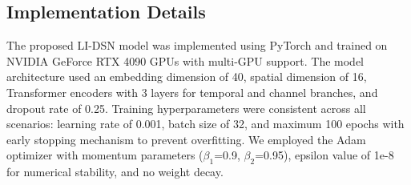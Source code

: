 \documentclass[journal]{IEEEtran}
\theoremstyle{plain}
\begin{document}
\begin{table}[!htbp]
    \caption{Emotion recognition results of different methods on the SEED and FACED datasets. (\textbf{Bold}: best; \underline{Underline}: second best)}
    \renewcommand{\arraystretch}{1.4}
    \centering
    \footnotesize
    \setlength{\tabcolsep}{1pt}
    \label{seedfaced}
\end{table}

\subsection{Implementation Details}
The proposed LI-DSN model was implemented using PyTorch and trained on NVIDIA GeForce RTX 4090 GPUs with multi-GPU support. The model architecture used an embedding dimension of 40, spatial dimension of 16, Transformer encoders with 3 layers for temporal and channel branches, and dropout rate of 0.25. Training hyperparameters were consistent across all scenarios: learning rate of 0.001, batch size of 32, and maximum 100 epochs with early stopping mechanism to prevent overfitting.  We employed the Adam optimizer with momentum parameters (\(\beta_{1}\)=0.9, \(\beta_{2}\)=0.95), epsilon value of 1e-8 for numerical stability, and no weight decay. 
\end{document}
